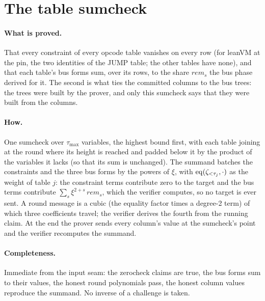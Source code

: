 \section{The table sumcheck}\label{sec:ph-table}

\paragraph{What is proved.} That every constraint of every opcode table vanishes on every row
(for leanVM at the pin, the two identities of the JUMP table; the other tables have none), and
that each table's bus forms sum, over its rows, to the share $\mathit{rem}_s$ the bus phase
derived for it. The second is what ties the committed columns to the bus trees: the trees were
built by the prover, and only this sumcheck says that they were built from the columns.

\paragraph{How.} One sumcheck over $\tau_{\max}$ variables, the highest bound first, with each
table joining at the round where its height is reached and padded below it by the product of
the variables it lacks (so that its sum is unchanged). The summand batches the constraints and
the three bus forms by the powers of $\xi$, with $\mathrm{eq}(\zeta_{< \tau_j}, \cdot)$ as the weight
of table $j$: the constraint terms contribute zero to the target and the bus terms contribute
$\sum_s \xi^{2 + s}\, \mathit{rem}_s$, which the verifier computes, so no target is ever sent.
A round message is a cubic (the equality factor times a degree-2 term) of which three
coefficients travel; the verifier derives the fourth from the running claim. At the end the
prover sends every column's value at the sumcheck's point and the verifier recomputes the
summand.

\paragraph{Completeness.} Immediate from the input seam: the zerocheck claims are true, the bus
forms sum to their values, the honest round polynomials pass, the honest column values
reproduce the summand. No inverse of a challenge is taken.

